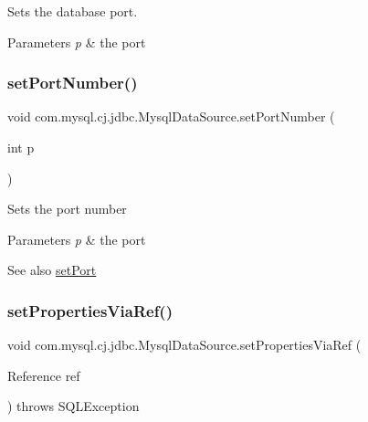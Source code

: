 Sets the database port.


\begin{DoxyParams}{Parameters}
{\em p} & the port \\
\hline
\end{DoxyParams}
\mbox{\label{classcom_1_1mysql_1_1cj_1_1jdbc_1_1_mysql_data_source_ac67d0eda45968c9dd12c4ea7241cead1}} 
\subsubsection{\texorpdfstring{set\+Port\+Number()}{setPortNumber()}}
{\footnotesize\ttfamily void com.\+mysql.\+cj.\+jdbc.\+Mysql\+Data\+Source.\+set\+Port\+Number (\begin{DoxyParamCaption}\item[{int}]{p }\end{DoxyParamCaption})}

Sets the port number


\begin{DoxyParams}{Parameters}
{\em p} & the port\\
\hline
\end{DoxyParams}
\begin{DoxySeeAlso}{See also}
\mbox{\hyperlink{classcom_1_1mysql_1_1cj_1_1jdbc_1_1_mysql_data_source_a008a1d301424119b5820fa8e3acd1ce7}{set\+Port}} 
\end{DoxySeeAlso}
\mbox{\label{classcom_1_1mysql_1_1cj_1_1jdbc_1_1_mysql_data_source_a5b168678c34fa8a4d27c480e78a2cab7}} 
\subsubsection{\texorpdfstring{set\+Properties\+Via\+Ref()}{setPropertiesViaRef()}}
{\footnotesize\ttfamily void com.\+mysql.\+cj.\+jdbc.\+Mysql\+Data\+Source.\+set\+Properties\+Via\+Ref (\begin{DoxyParamCaption}\item[{Reference}]{ref }\end{DoxyParamCaption}) throws S\+Q\+L\+Exception}

